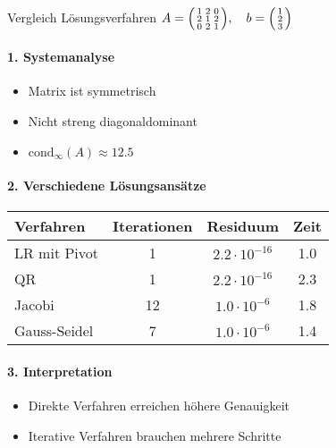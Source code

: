 \begin{KR}{Vergleich Lösungsverfahren}
$A = \begin{psmallmatrix}
1 & 2 & 0\\
2 & 1 & 2\\
0 & 2 & 1
\end{psmallmatrix}, \quad b = \begin{psmallmatrix}
1\\
2\\
3
\end{psmallmatrix}$

\paragraph{1. Systemanalyse}
\begin{itemize}
    \item Matrix ist symmetrisch
    \item Nicht streng diagonaldominant
    \item $\text{cond}_\infty(A) \approx 12.5$
\end{itemize}

\paragraph{2. Verschiedene Lösungsansätze}
\begin{center}
\begin{tabular}{l|ccc}
Verfahren & Iterationen & Residuum & Zeit\\
\hline
LR mit Pivot & 1 & $2.2\cdot10^{-16}$ & 1.0\\
QR & 1 & $2.2\cdot10^{-16}$ & 2.3\\
Jacobi & 12 & $1.0\cdot10^{-6}$ & 1.8\\
Gauss-Seidel & 7 & $1.0\cdot10^{-6}$ & 1.4\\
\end{tabular}
\end{center}

\paragraph{3. Interpretation}
\begin{itemize}
    \item Direkte Verfahren erreichen höhere Genauigkeit
    \item Iterative Verfahren brauchen mehrere Schritte
\end{itemize}
\end{KR}

